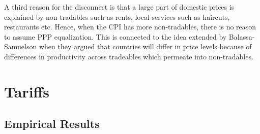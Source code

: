 \documentclass[12pt]{article}
\begin{document}
A third reason for the disconnect is that a large part of domestic prices is explained by non-tradables such as rents, local services such as haircuts, restaurants etc. Hence, when the CPI has more non-tradables, there is no reason to assume PPP equalization. This is connected to the idea extended by Balassa-Samuelson when they argued that countries will differ in price levels because of differences in productivity across tradeables which permeate into non-tradables.

\cite{Rogoff1996JEL}

\cite{Balassa1964JPE}

\cite{Pinkovskiy2020AEJM}

\cite{Taylor2002JEP}

\cite{Dornbusch1987PDE}

\cite{Vo2023JES}

\cite{Frenkel1978JIE}

\section{Tariffs}

\subsection{Empirical Results}
\cite{Suwanprasert2026IE}


















\clearpage
\begingroup
\footnotesize
\setlength{\bibsep}{0.2em}


\endgroup
\end{document}
